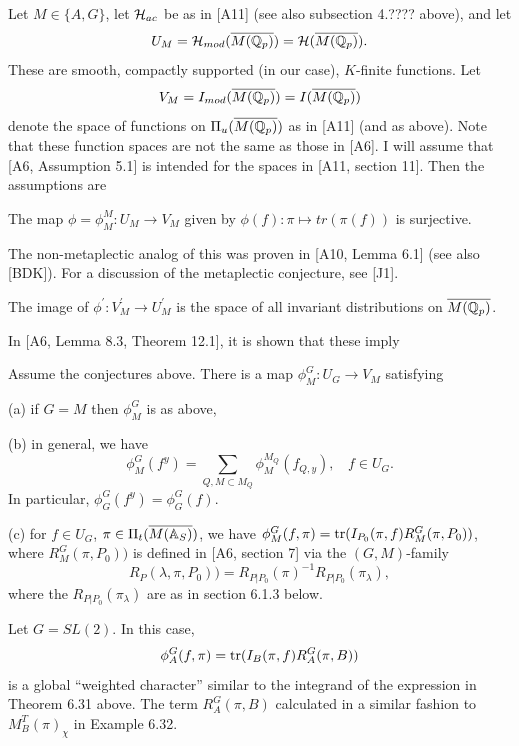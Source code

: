 Let $M\in \{A,G\}$, let ${\cal{H}}_{ac}$ be as in
[A11] (see also subsection 4.???? above),
and let 
\[
U_M={\cal{H}}_{mod}(\overline{M({\Bbb{Q}}_p)})
={\cal{H}}(\overline{M({\Bbb{Q}}_p)}) .
\]
These are smooth, compactly supported (in our case), $K$-finite
functions. Let 
\[
V_M=I_{mod}(\overline{M({\Bbb{Q}}_p)}) =I(\overline{M({\Bbb{Q}}_p)})
\]
denote the space of functions on $\Pi _u(\overline{M({\Bbb{Q}}_p)})$ as
in [A11] (and as above).
Note that these function spaces are not the same as those in [A6].
I will assume that [A6, Assumption 5.1] is intended
for the spaces in [A11, section 11].
Then the assumptions are

\begin{conjecture}
The map $\phi=\phi_M^M :U_M\rightarrow V_M$ given by
$\phi (f):\pi \longmapsto tr(\pi (f)) $ is surjective.
\end{conjecture}

The non-metaplectic analog of this
was proven in [A10, Lemma 6.1] (see also [BDK]).
For a discussion of the metaplectic conjecture, see [J1].

\begin{conjecture}
The image of $\phi ^{\prime }:V_M^{\prime }\rightarrow U_M^{\prime }$ is the
space of all invariant distributions on
$\overline{M({\Bbb {Q}}_p)}$.
\end{conjecture}

In [A6, Lemma 8.3, Theorem 12.1], it is shown that these imply

\begin{theorem} Assume the conjectures above.
There is a map $\phi^G_M :U_G\rightarrow V_M$ satisfying

(a) if $G=M$ then $\phi^G_M$ is as above,

(b) in general, we have
\[
\phi_M^G(f^y)=
\sum_{Q ,M\subset M_Q}
\phi_M^{M_Q}(f_{Q,y}),\ \ \ \ f\in U_G.
\]
In particular, $\phi_G^G(f^y)=\phi_G^G(f)$.

(c) for $f\in U_G$, $\pi\in \Pi_t(\overline{M({\Bbb{A}}_S)})$,
we have $\phi^G_M(f,\pi)={\rm tr}(I_{P_0}(\pi,f)R_M^G(\pi,P_0))$,
where $R_M^G(\pi,P_0))$ is defined in [A6, section 7]
via the $(G,M)$-family
\[
R_P(\lambda, \pi,P_0))=
R_{P|P_0}(\pi)^{-1}R_{P|P_0}(\pi_\lambda),
\]
where the $R_{P|P_0}(\pi_\lambda)$ are as in section 6.1.3 below.
\end{theorem}

\begin{example} Let $G=SL(2)$. In this case,
\[
\phi^G_A(f,\pi)={\rm tr}(I_{B}(\pi,f)R_A^G(\pi,B))
\]
is a global ``weighted character'' similar to the integrand of
the expression in Theorem 6.31 above. The term $R_A^G(\pi,B)$
calculated in a similar fashion to $M_B^T(\pi)_\chi$
in Example 6.32.
\end{example}

